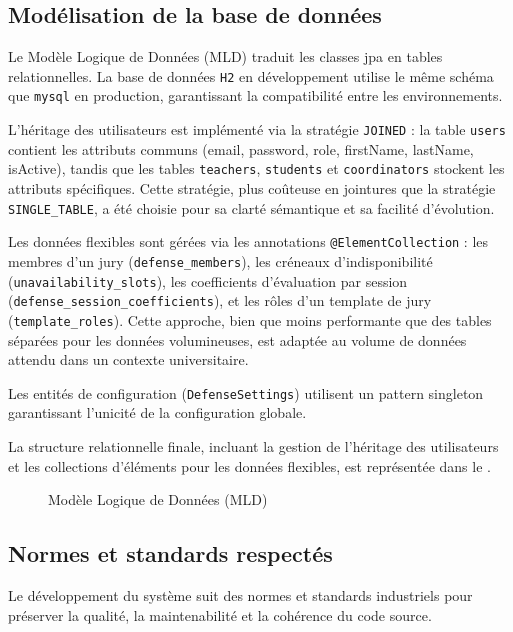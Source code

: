 \subsection{Modélisation de la base de données}
\label{ch3:mld}

Le Modèle Logique de Données (MLD) traduit les classes \acrshort{jpa} en tables relationnelles. La base de données \texttt{H2} en développement utilise le même schéma que \texttt{\acrshort{mysql}} en production, garantissant la compatibilité entre les environnements.

L'héritage des utilisateurs est implémenté via la stratégie \texttt{JOINED} : la table \texttt{users} contient les attributs communs (email, password, role, firstName, lastName, isActive), tandis que les tables \texttt{teachers}, \texttt{students} et \texttt{coordinators} stockent les attributs spécifiques. Cette stratégie, plus coûteuse en jointures que la stratégie \texttt{SINGLE\_TABLE}, a été choisie pour sa clarté sémantique et sa facilité d'évolution.

Les données flexibles sont gérées via les annotations \texttt{@ElementCollection} : les membres d'un jury (\texttt{defense\_members}), les créneaux d'indisponibilité (\texttt{unavailability\_slots}), les coefficients d'évaluation par session (\texttt{defense\_session\_coefficients}), et les rôles d'un template de jury (\texttt{template\_roles}). Cette approche, bien que moins performante que des tables séparées pour les données volumineuses, est adaptée au volume de données attendu dans un contexte universitaire.

Les entités de configuration (\texttt{DefenseSettings}) utilisent un pattern singleton garantissant l'unicité de la configuration globale.

La structure relationnelle finale, incluant la gestion de l'héritage des utilisateurs et les collections d'éléments pour les données flexibles, est représentée dans le .
\begin{figure}[H]
    \centering
    \caption{Modèle Logique de Données (MLD)}
    \label{fig:mld_schema}
\end{figure}

\subsection{Normes et standards respectés}
\label{ch3:normes}

Le développement du système suit des normes et standards industriels pour préserver la qualité, la maintenabilité et la cohérence du code source.

